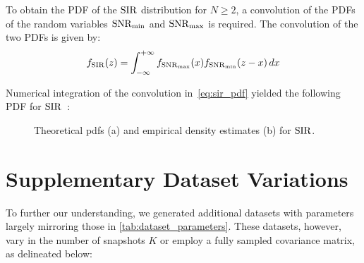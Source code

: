 To obtain the PDF of the \( \mathrm{SIR} \) distribution for \( N \geq 2 \), a convolution of the PDFs of the random variables \( \mathrm{SNR}_{\min} \) and \( \mathrm{SNR}_{\max} \)
is required. The convolution of the two PDFs is given by:
\begin{equation}
    f_{\mathrm{SIR}}(z) = \int_{-\infty}^{+\infty} f_{\mathrm{SNR}_{\max}}(x) f_{\mathrm{SNR}_{\min}}(z - x) \, dx
    \label{eq:sir_pdf}
\end{equation}

Numerical integration of the convolution in~\autoref{eq:sir_pdf} yielded the following PDF for \( \mathrm{SIR} \)~\cite[Chapter 8.2]{blitzstein2019}:
\begin{figure}[H]
    \centering
    \caption{Theoretical \glspl{pdf} (a) and empirical density estimates (b) for \( \mathrm{SIR} \).}
    \label{fig:sir_pdf}
\end{figure}

\section{Supplementary Dataset Variations}
\label{sec:supplementary_datasets}
To further our understanding, we generated additional datasets with parameters largely mirroring those in \autoref{tab:dataset_parameters}.
These datasets, however, vary in the number of snapshots \( K \) or employ a fully sampled covariance matrix, as delineated below:

